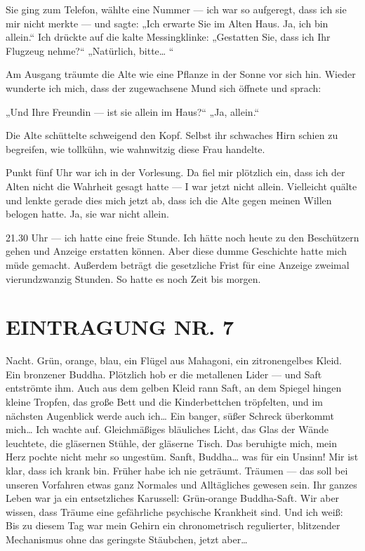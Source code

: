 Sie ging zum Telefon, wählte eine Nummer — ich war so aufgeregt,
dass ich sie mir nicht merkte — und sagte: „Ich erwarte Sie im
Alten Haus. Ja, ich bin allein.“ Ich drückte auf die kalte
Messingklinke: „Gestatten Sie, dass ich Ihr Flugzeug nehme?“
„Natürlich, bitte\ldots{} “

Am Ausgang träumte die Alte wie eine Pflanze in der Sonne vor sich
hin. Wieder wunderte ich mich, dass der zugewachsene Mund sich
öffnete und sprach:

„Und Ihre Freundin — ist sie allein im Haus?“ „Ja, allein.“

Die Alte schüttelte schweigend den Kopf. Selbst ihr schwaches Hirn
schien zu begreifen, wie tollkühn, wie wahnwitzig diese Frau
handelte.

Punkt fünf Uhr war ich in der Vorlesung. Da fiel mir plötzlich ein,
dass ich der Alten nicht die Wahrheit gesagt hatte — I war jetzt
nicht allein. Vielleicht quälte und lenkte gerade dies mich jetzt
ab, dass ich die Alte gegen meinen Willen belogen hatte. Ja, sie
war nicht allein.

21.30 Uhr — ich hatte eine freie Stunde. Ich hätte noch heute zu
den Beschützern gehen und Anzeige erstatten können. Aber diese
dumme Geschichte hatte mich müde gemacht. Außerdem beträgt die
gesetzliche Frist für eine Anzeige zweimal vierundzwanzig Stunden.
So hatte es noch Zeit bis morgen.

\section{EINTRAGUNG NR. 7}

Nacht. Grün, orange, blau, ein Flügel aus Mahagoni, ein
zitronengelbes Kleid. Ein bronzener Buddha. Plötzlich hob er die
metallenen Lider — und Saft entströmte ihm. Auch aus dem gelben
Kleid rann Saft, an dem Spiegel hingen kleine Tropfen, das große
Bett und die Kinderbettchen tröpfelten, und im nächsten Augenblick
werde auch ich\ldots{} Ein banger, süßer Schreck überkommt mich\ldots{} Ich
wachte auf. Gleichmäßiges bläuliches Licht, das Glas der Wände
leuchtete, die gläsernen Stühle, der gläserne Tisch.
Das beruhigte mich, mein Herz pochte nicht mehr so ungestüm.
Sanft, Buddha\ldots{} was für ein Unsinn! Mir ist klar, dass ich krank
bin. Früher habe ich nie geträumt. Träumen — das soll bei unseren
Vorfahren etwas ganz Normales und Alltägliches gewesen sein. Ihr
ganzes Leben war ja ein entsetzliches Karussell: Grün-orange
Buddha-Saft. Wir aber wissen, dass Träume eine gefährliche
psychische Krankheit sind. Und ich weiß: Bis zu diesem Tag war mein
Gehirn ein chronometrisch regulierter, blitzender Mechanismus ohne
das geringste Stäubchen, jetzt aber\ldots{}

